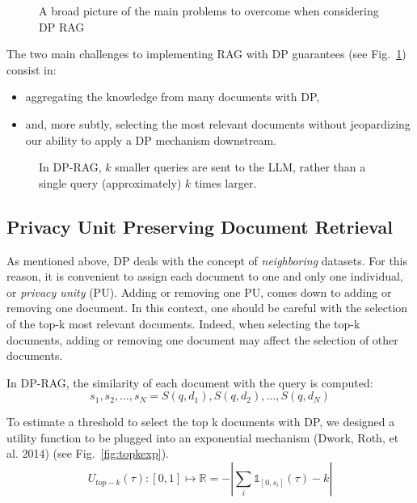 \documentclass[
  12pt,
  a4paper,
]{article}
\providecommand{\tightlist}{%
  \setlength{\itemsep}{0pt}\setlength{\parskip}{0pt}}
\begin{document}
\begin{figure}
\centering

\caption{A broad picture of the main problems to overcome when
considering DP RAG}\label{fig:ragpriv}
\end{figure}

The two main challenges to implementing RAG with DP guarantees (see
Fig.~\ref{fig:ragpriv}) consist in:

\begin{itemize}
\tightlist
\item
  aggregating the knowledge from many documents with DP,
\item
  and, more subtly, selecting the most relevant documents without
  jeopardizing our ability to apply a DP mechanism downstream.
\end{itemize}

\begin{figure}
\centering

\caption{In DP-RAG, \(k\) smaller queries are sent to the LLM, rather
than a single query (approximately) \(k\) times
larger.}\label{fig:dprag}
\end{figure}

\subsection{Privacy Unit Preserving Document
Retrieval}\label{privacy-unit-preserving-document-retrieval}

As mentioned above, DP deals with the concept of \emph{neighboring}
datasets. For this reason, it is convenient to assign each document to
one and only one individual, or \emph{privacy unity} (PU). Adding or
removing one PU, comes down to adding or removing one document. In this
context, one should be careful with the selection of the top-k most
relevant documents. Indeed, when selecting the top-k documents, adding
or removing one document may affect the selection of other documents.

In DP-RAG, the similarity of each document with the query is computed:
\[s_1, s_2,\ldots, s_N = S(q, d_1), S(q, d_2), \ldots, S(q, d_N)\]

To estimate a threshold to select the top k documents with DP, we
designed a utility function to be plugged into an exponential mechanism
(Dwork, Roth, et al. 2014) (see Fig.~\ref{fig:topkexp}).
\[U_{top-k}(\tau): [0, 1] \mapsto \mathbb{R} = -\left|\sum_i\mathbb{1}_{[0, s_i]}(\tau)-k\right|\]
\end{document}
